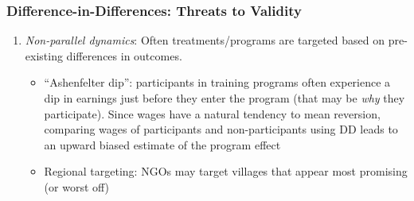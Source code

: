 \documentclass{beamer}
\numberwithin{equation}{section}
\begin{document}
\begin{frame}
  \frametitle{Difference-in-Differences: Threats to Validity}

\begin{enumerate}
 \item \emph{Non-parallel dynamics}: Often treatments/programs are targeted based on pre-existing differences in outcomes.\medskip
 \begin{itemize}
   \item ``Ashenfelter dip'': participants in training programs often experience a dip in earnings
just before they enter the program (that may be \emph{why} they participate). Since wages have a natural tendency to mean reversion, comparing wages of participants and non-participants using DD leads to an upward biased estimate of the program effect\medskip
   \item Regional targeting: NGOs may target villages that appear most promising (or worst off)\medskip
 \end{itemize}

\end{enumerate}
\end{frame}
\end{document}
